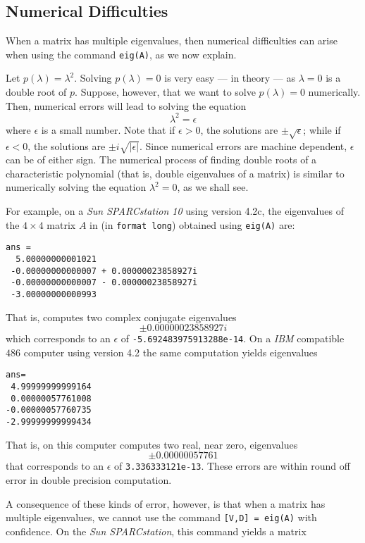 \documentclass{ximera}
\begin{document}
\subsection*{Numerical Difficulties}

When a matrix has multiple eigenvalues, then numerical difficulties
can arise when using the \Matlab command {\tt eig(A)}, as we now explain.

Let $p(\lambda)=\lambda^2$.  Solving $p(\lambda)=0$ is very easy --- in theory
--- as $\lambda=0$ is a double root of $p$.  Suppose, however, that 
we want to solve $p(\lambda)=0$ numerically.  Then, numerical errors 
will lead to solving the equation  
\[
\lambda^2 = \epsilon
\]
where $\epsilon$ is a small number.  Note that if $\epsilon>0$, the 
solutions are $\pm\sqrt{\epsilon}$; while if $\epsilon<0$, the solutions 
are $\pm i\sqrt{|\epsilon|}$.  Since numerical errors are machine 
dependent, $\epsilon$ can be of either sign.  The numerical process of
finding double roots of a characteristic polynomial (that is, double 
eigenvalues of a matrix) is similar to numerically solving the equation 
$\lambda^2=0$, as we shall see.

For example, on a
{\em Sun SPARCstation 10\/} using \Matlab version 4.2c, the eigenvalues 
of the $4\times 4$ matrix $A$ in  (in {\tt format long}) 
obtained using {\tt eig(A)} are:
\begin{verbatim}
ans = 
  5.00000000001021                    
 -0.00000000000007 + 0.00000023858927i
 -0.00000000000007 - 0.00000023858927i
 -3.00000000000993       
\end{verbatim}
That is, \Matlab computes two complex conjugate eigenvalues
\[
\pm 0.00000023858927i
\]
which corresponds to an $\epsilon$ of {\tt -5.692483975913288e-14}.
On a {\em IBM\/} compatible $486$ computer using \Matlab version 4.2
the same computation yields eigenvalues
\begin{verbatim}
ans=
 4.99999999999164
 0.00000057761008
-0.00000057760735
-2.99999999999434
\end{verbatim}
That is, on this computer \Matlab computes two real, near zero, 
eigenvalues 
\[ 
\pm 0.00000057761
\]
that corresponds to an $\epsilon$ of {\tt 3.336333121e-13}. These
errors are within round off error in 
double precision computation.

A consequence of these kinds of error, however, is that when a matrix
has multiple eigenvalues, we cannot use the command {\tt [V,D] = eig(A)} 
with confidence. On the {\em Sun SPARCstation\/}, this command yields 
a matrix 
\end{document}
